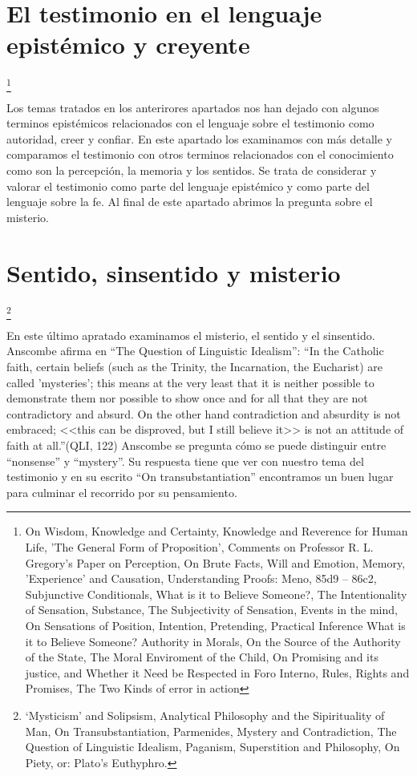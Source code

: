 \documentclass[../main.tex]{subfiles}
\begin{document}
\section{El testimonio en el lenguaje epistémico y creyente}
\footnote{
On Wisdom, 
Knowledge and Certainty, 
Knowledge and Reverence for Human Life, 
'The General Form of Proposition', 
Comments on Professor R. L. Gregory's Paper on Perception, 
On Brute Facts, 
Will and Emotion, 
Memory, 'Experience' and Causation, 
Understanding Proofs: Meno, 85d9 – 86c2, 
Subjunctive Conditionals, 
What is it to Believe Someone?, 
The Intentionality of Sensation, 
Substance, 
The Subjectivity of Sensation, 
Events in the mind, 
On Sensations of Position, 
Intention, 
Pretending, 
Practical Inference
What is it to Believe Someone?
Authority in Morals, 
On the Source of the Authority of the State, 
The Moral Enviroment of the Child, 
On Promising and its justice, and Whether it Need be Respected in Foro Interno, 
Rules, Rights and Promises, 
The Two Kinds of error in action
}

Los temas tratados en los anterirores apartados nos han dejado con algunos terminos epistémicos relacionados con el lenguaje sobre el testimonio como autoridad, creer y confiar. En este apartado los examinamos con más detalle y comparamos el testimonio con otros terminos relacionados con el conocimiento como son la percepción, la memoria y los sentidos. Se trata de considerar y valorar el testimonio como parte del lenguaje epistémico y como parte del lenguaje sobre la fe. Al final de este apartado abrimos la pregunta sobre el misterio.

\section{Sentido, sinsentido y misterio}
\footnote{
`Mysticism' and Solipsism, 
Analytical Philosophy and the Sipirituality of Man, 
On Transubstantiation, 
Parmenides, Mystery and Contradiction, 
The Question of Linguistic Idealism, 
Paganism, Superstition and Philosophy, 
On Piety, or: Plato's Euthyphro.
}

En este último apratado examinamos el misterio, el sentido y el sinsentido. Anscombe afirma en ``The Question of Linguistic Idealism'': ``In the Catholic faith, certain beliefs (such as the Trinity, the Incarnation, the Eucharist) are called 'mysteries'; this means at the very least that it is neither possible to demonstrate them nor possible to show once and for all that they are not contradictory and absurd. On the other hand contradiction and absurdity is not embraced; <<this can be disproved, but I still believe it>> is not an attitude of faith at all.''(QLI, 122) Anscombe se pregunta cómo se puede distinguir entre ``nonsense'' y ``mystery''. Su respuesta tiene que ver con nuestro tema del testimonio y en su escrito ``On transubstantiation'' encontramos un buen lugar para culminar el recorrido por su pensamiento.
\end{document}
